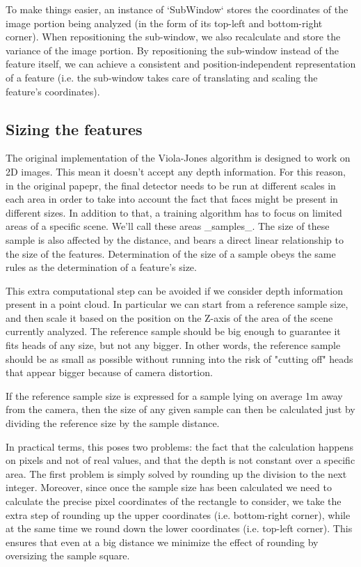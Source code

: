 \documentclass[a4paper,12pt,titlepage]{article}
\begin{document}
To make things easier, an instance of `SubWindow` stores the coordinates of the
image portion being analyzed (in the form of its top-left and bottom-right
corner). When repositioning the sub-window, we also recalculate and store the
variance of the image portion. By repositioning the sub-window instead of the
feature itself, we can achieve a consistent and position-independent
representation of a feature (i.e. the sub-window takes care of translating and
scaling the feature's coordinates).

\subsection{Sizing the features}
The original implementation of the Viola-Jones algorithm is designed to work on
2D images. This mean it doesn't accept any depth information. For this reason,
in the original papepr, the final detector needs to be run at different scales
in each area in order to take into account the fact that faces might be present
in different sizes.
In addition to that, a training algorithm has to focus on limited areas of a
specific scene. We'll call these areas _samples_. The size of these sample is
also affected by the distance, and bears a direct linear relationship to the
size of the features. Determination of the size of a sample obeys the same rules
as the determination of a feature's size.

This extra computational step can be avoided if we consider depth information
present in a point cloud. In particular we can start from a reference sample
size, and then scale it based on the position on the Z-axis of the area of the
scene currently analyzed.
The reference sample should be big enough to guarantee it fits heads of any
size, but not any bigger. In other words, the reference sample should be as
small as possible without running into the risk of "cutting off" heads that
appear bigger because of camera distortion.

If the reference sample size is expressed for a sample lying on average 1m away
from the camera, then the size of any given sample can then be calculated just
by dividing the reference size by the sample distance.

In practical terms, this poses two problems: the fact that the calculation
happens on pixels and not of real values, and that the depth is not constant
over a specific area.
The first problem is simply solved by rounding up the division to the next
integer. Moreover, since once the sample size has been calculated we need to
calculate the precise pixel coordinates of the rectangle to consider, we take
the extra step of rounding up the upper coordinates (i.e. bottom-right corner),
while at the same time we round down the lower coordinates (i.e. top-left
corner). This ensures that even at a big distance we minimize the effect of
rounding by oversizing the sample square.
\end{document}
